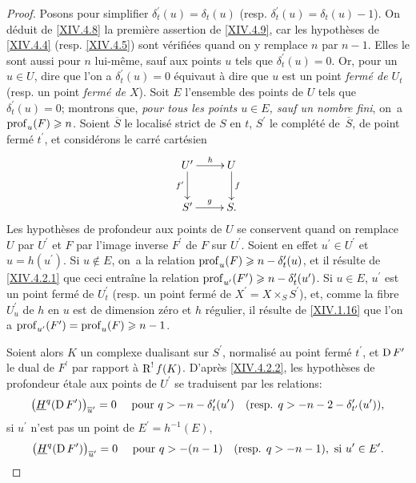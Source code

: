 \begin{proof}
Posons pour simplifier $\delta_{t}^{\prime}(u)=\delta_{t}(u)$ (resp. $\delta_{t}^{\prime}(u)=\delta_{t}(u)-1$). On d\'eduit de \ref{XIV.4.8} la premi\`ere assertion de \ref{XIV.4.9}, car les hypoth\`eses de \ref{XIV.4.4} (resp. \ref{XIV.4.5}) sont v\'erifi\'ees quand on y remplace $n$ par $n-1$. Elles le sont aussi pour $n$ lui-m\^eme, sauf aux points $u$ tels que $\delta_{t}^{\prime}(u)=0$. Or, pour un $u\in U$, dire que l'on a $\delta_{t}^{\prime}(u)=0$ \'equivaut \`a dire que $u$ est un point \emph{fermé de $U_{t}$} (resp. un point \emph{fermé de $X$}). Soit $E$ l'ensemble des points de $U$ tels que $\delta_{t}^{\prime}(u)=0$; montrons que, \emph{pour tous les points $u\in E$, sauf un nombre fini}, on~a $\operatorname{prof}_{u}(F)\geqslant n$. Soient $\overline{S}$ le localis\'e strict de $S$ en $t$, $S^{\prime}$ le compl\'et\'e de~$\overline{S}$, de point ferm\'e $t^{\prime}$, et consid\'erons le carr\'e cart\'esien
$$
\xymatrix{ U^{\prime}\ar[r]^-{h}\ar[d]_-{f^{\prime}} & U\ar[d]^-{f}\\
S^{\prime}\ar[r]^-{g} & S.}$$
Les hypoth\`eses de profondeur aux points de $U$ se conservent quand on remplace $U$ par $U^{\prime}$ et $F$ par l'image inverse $F^{\prime}$ de $F$ sur $U^{\prime}$. Soient en effet $u^{\prime}\in U^{\prime}$ et $u=h(u^{\prime})$. Si $u\not\in E$, on~a la relation $\operatorname{prof}_{u}(F)\geqslant n-\delta_{t}^{\prime}(u)$, et il r\'esulte de \ref{XIV.4.2.1} que ceci entra\^ine la relation $\operatorname{prof}_{u^{\prime}}(F^{\prime})\geqslant n-\delta_{t}^{\prime}(u^{\prime})$. Si $u\in E$, $u^{\prime}$ est un point ferm\'e de $U_{t}^{\prime}$ (resp. un point ferm\'e de $X^{\prime}=X\times_{S}S^{\prime}$), et, comme la fibre $U_{u}^{\prime}$ de $h$ en $u$ est de dimension z\'ero et $h$ r\'egulier, il r\'esulte de \ref{XIV.1.16} que l'on a $\operatorname{prof}_{u^{\prime}}(F^{\prime})=\operatorname{prof}_{u}(F)\geqslant n-1$.

Soient alors $K$ un complexe dualisant sur $S^{\prime}$, normalis\'e au point ferm\'e $t^{\prime}$, et $\operatorname{D} F^{\prime}$ le dual de $F^{\prime}$ par rapport \`a $\operatorname{R}^{!}f(K)$. D'apr\`es \ref{XIV.4.2.2}, les hypoth\`eses de profondeur \'etale aux points de $U^{\prime}$ se traduisent par les relations:
$$
\big(\underline{H}^{q}(\operatorname{D} F^{\prime})\big)_{\overline{u}^{\prime}}=0\quad\textrm{ pour }q>-n-\delta_{t}^{\prime}(u^{\prime})\quad(\textrm{resp. }q>-n-2-\delta_{t^{\prime}}^{\prime}(u^{\prime})),
$$
si $u^{\prime}$ n'est pas un point de $E^{\prime}=h^{-1}(E)$,
$$
\big(\underline{H}^{q}(\operatorname{D} F^{\prime})\big)_{\overline{u}^{\prime}}=0\quad\textrm{ pour }q>-(n-1)\quad(\textrm{resp. }q>-n-1), \textrm{ si }u^{\prime}\in E^{\prime}.
$$


\end{proof}
